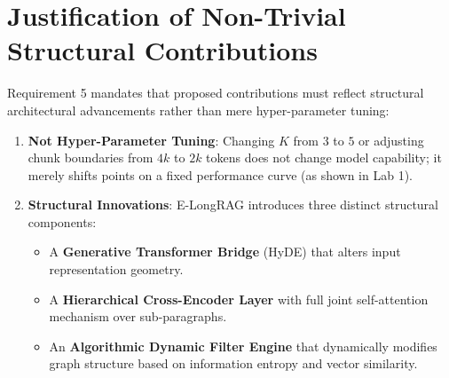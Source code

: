 \documentclass[11pt,a4paper]{article}
\begin{document}
\begin{table}[h!]
\centering
\caption{Quantitative System \& Quality Metric Improvements (E-LongRAG vs. Baseline LongRAG)}
\label{tab:impact_matrix}
\end{table}

\section{Justification of Non-Trivial Structural Contributions}
Requirement 5 mandates that proposed contributions must reflect structural architectural advancements rather than mere hyper-parameter tuning:

\begin{enumerate}
    \item \textbf{Not Hyper-Parameter Tuning}: Changing $K$ from $3$ to $5$ or adjusting chunk boundaries from $4k$ to $2k$ tokens does not change model capability; it merely shifts points on a fixed performance curve (as shown in Lab 1).
    \item \textbf{Structural Innovations}: E-LongRAG introduces three distinct structural components:
      \begin{itemize}
          \item A \textbf{Generative Transformer Bridge} (HyDE) that alters input representation geometry.
          \item A \textbf{Hierarchical Cross-Encoder Layer} with full joint self-attention mechanism over sub-paragraphs.
          \item An \textbf{Algorithmic Dynamic Filter Engine} that dynamically modifies graph structure based on information entropy and vector similarity.
      \end{itemize}
\end{enumerate}
\end{document}

